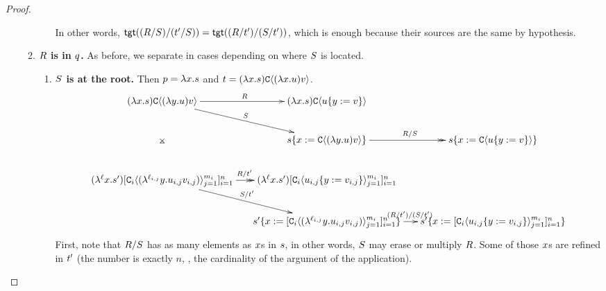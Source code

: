 \begin{proof}
\begin{enumerate}
\begin{enumerate}
\begin{enumerate}
            In other words, $\mathsf{tgt}((R / S) / (t' / S)) =
                             \mathsf{tgt}((R / t') / (S / t'))$, which is enough because their sources
                             are the same by hypothesis.
        \end{enumerate}
      \item {\bf $R$ is in $q$.} As before, we separate in cases depending on where $S$ is located.
        \begin{enumerate}
          \item {\bf $S$ is at the root.} Then $p = \lambda x. s$
            and $t = (\lambda x. s) \mathtt{C}\langle(\lambda x. u) v\rangle$.
            {\tiny
            \[
              \xymatrix@C=.5cm{
              (\lam{\var}{\tmtwo}) \conof{(\lam{\vartwo}{\tmthree}) \tmthreevariant}
                \ar@{->}[r]^{\redex} \ar@{->}[rd]^{\redextwo} \ar@{}[dd]|*=0[@]{\rtimes}
                  & (\lam{\var}{\tmtwo}) \conof{\subs{\tmthree}{\vartwo}{\tmthreevariant}} & \\
                & \subs{\tmtwo}{\var}{\conof{(\lam{\vartwo}{\tmthree}) \tmthreevariant}}
                  \ar@{->>}[r]^{\redex / \redextwo}
                    & \subs{\tmtwo}{\var}{\conof{\subs{\tmthree}{\vartwo}{\tmthreevariant}}} \\
                \ar@{->>}[r]^{\redex / \tm'} \ar@{->}[rd]^{\redextwo / \tm'}
              (\lamp{\lab}{\var}{\tmtwo'}) [\con_i\of{(\lamp{\lab_{i,j}}{\vartwo}{\tmthree_{i,j}} \tmthreevariant_{i,j})}_{j=1}^{m_i}]_{i=1}^n
                  & (\lamp{\lab}{\var}{\tmtwo'}) [\con_i\of{\subs{\tmthree_{i,j}}{\vartwo}{\tmthreevariant_{i,j}}}_{j=1}^{m_i}]_{i=1}^n & \\
                & \subs{\tmtwo'}{\var}{[\con_i\of{(\lamp{\lab_{i,j}}{\vartwo}{\tmthree_{i,j}} \tmthreevariant_{i,j})}_{j=1}^{m_i}]_{i=1}^n} \ar@{->}[r]^{(\redex / \tm') / (\redextwo / \tm')}
                  & \subs{\tmtwo'}{\var}{[\con_i\of{\subs{\tmthree_{i,j}}{\vartwo}{\tmthreevariant_{i,j}}}_{j=1}^{m_i}]_{i=1}^n}
              }
            \]
            }
            First, note that $R / S$ has as many elements as $x$s in $s$, in other words,
            $S$ may erase or multiply $R$.
            Some of those $x$s are refined in $t'$ (the number is exactly $n$,
            \ie, the cardinality of the argument of the application).


\end{enumerate}
\end{enumerate}
\end{enumerate}
\end{proof}
